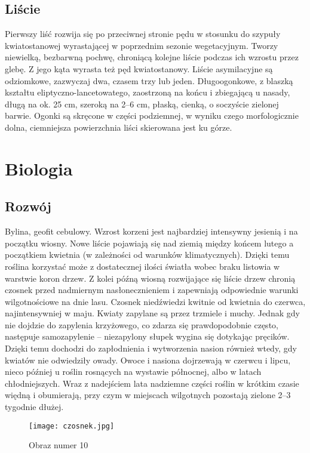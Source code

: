 \subsection{Liście}
Pierwszy liść rozwija się po przeciwnej stronie pędu w stosunku do szypuły kwiatostanowej wyrastającej w poprzednim sezonie wegetacyjnym. Tworzy niewielką, bezbarwną pochwę, chroniącą kolejne liście podczas ich wzrostu przez glebę. Z jego kąta wyrasta też pęd kwiatostanowy. Liście asymilacyjne są odziomkowe, zazwyczaj dwa, czasem trzy lub jeden. Długoogonkowe, z blaszką kształtu eliptyczno-lancetowatego, zaostrzoną na końcu i zbiegającą u nasady, długą na ok. 25 cm, szeroką na 2–6 cm, płaską, cienką, o soczyście zielonej barwie. Ogonki są skręcone w części podziemnej, w wyniku czego morfologicznie dolna, ciemniejsza powierzchnia liści skierowana jest ku górze.


\section{Biologia}
\subsection{Rozwój}
Bylina, geofit cebulowy. Wzrost korzeni jest najbardziej intensywny jesienią i na początku wiosny. Nowe liście pojawiają się nad ziemią między końcem lutego a początkiem kwietnia (w zależności od warunków klimatycznych). Dzięki temu roślina korzystać może z dostatecznej ilości światła wobec braku listowia w warstwie koron drzew. Z kolei późną wiosną rozwijające się liście drzew chronią czosnek przed nadmiernym nasłonecznieniem i zapewniają odpowiednie warunki wilgotnościowe na dnie lasu. Czosnek niedźwiedzi kwitnie od kwietnia do czerwca, najintensywniej w maju. Kwiaty zapylane są przez trzmiele i muchy. Jednak gdy nie dojdzie do zapylenia krzyżowego, co zdarza się prawdopodobnie często, następuje samozapylenie – niezapylony słupek wygina się dotykając pręcików. Dzięki temu dochodzi do zapłodnienia i wytworzenia nasion również wtedy, gdy kwiatów nie odwiedziły owady. Owoce i nasiona dojrzewają w czerwcu i lipcu, nieco później u roślin rosnących na wystawie północnej, albo w latach chłodniejszych. Wraz z nadejściem lata nadziemne części roślin w krótkim czasie więdną i obumierają, przy czym w miejscach wilgotnych pozostają zielone 2–3 tygodnie dłużej.
\begin{figure}[ht]
 \centering
 \texttt{[image: czosnek.jpg]}
 \caption{Obraz numer 10}
 \label{figure10}
\end{figure}

